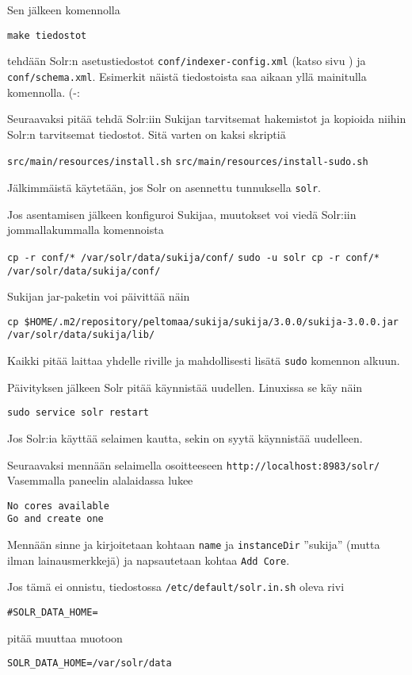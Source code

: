 \documentclass[12pt]{article}
\begin{document}
Sen jälkeen komennolla

\verb|make tiedostot|

tehdään Solr:n asetustiedostot \verb=conf/indexer-config.xml= (katso
sivu ) ja \verb=conf/schema.xml=. Esimerkit näistä
tiedostoista saa aikaan yllä mainitulla komennolla. (-:

Seuraavaksi pitää tehdä Solr:iin Sukijan tarvitsemat hakemistot ja
kopioida niihin Solr:n tarvitsemat tiedostot. Sitä varten on kaksi
skriptiä

\verb=src/main/resources/install.sh=
\verb=src/main/resources/install-sudo.sh=

Jälkimmäistä käytetään, jos Solr on asennettu tunnuksella \verb=solr=.


\bigskip
Jos asentamisen jälkeen konfiguroi Sukijaa, muutokset voi viedä
Solr:iin jommallakummalla komennoista

\verb=cp -r conf/* /var/solr/data/sukija/conf/=
\verb=sudo -u solr cp -r conf/* /var/solr/data/sukija/conf/=

Sukijan jar-paketin voi päivittää näin

\verb=cp $HOME/.m2/repository/peltomaa/sukija/sukija/3.0.0/sukija-3.0.0.jar /var/solr/data/sukija/lib/=

Kaikki pitää laittaa yhdelle riville ja mahdollisesti lisätä
\verb=sudo= komennon alkuun.

Päivityksen jälkeen Solr pitää käynnistää uudellen. Linuxissa se käy
näin

\verb=sudo service solr restart=

Jos Solr:ia käyttää selaimen kautta, sekin on syytä käynnistää
uudelleen.


\bigskip
Seuraavaksi mennään selaimella osoitteeseen \verb=http://localhost:8983/solr/=
Vasemmalla paneelin alalaidassa lukee 

\begin{verbatim}
No cores available
Go and create one
\end{verbatim}

Mennään sinne ja kirjoitetaan kohtaan \verb=name= ja \verb=instanceDir=
''sukija'' (mutta ilman lainausmerkkejä) ja napsautetaan kohtaa
\verb=Add Core=.

Jos tämä ei onnistu, tiedostossa \verb|/etc/default/solr.in.sh|
oleva rivi

\verb|#SOLR_DATA_HOME=|

pitää muuttaa muotoon

\verb|SOLR_DATA_HOME=/var/solr/data|
\end{document}
